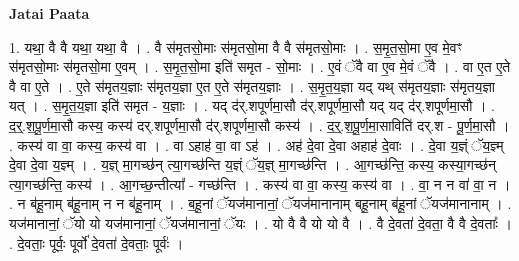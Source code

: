 \documentclass[17pt]{extarticle}
\begin{document}
\textbf{Jatai Paata} \newline

1. यथा॒ वै वै यथा॒ यथा॒ वै । . वै स॑मृतसो॒माः स॑मृतसो॒मा वै वै स॑मृतसो॒माः । . स॒मृ॒त॒सो॒मा ए॒व मे॒वꣳ स॑मृतसो॒माः स॑मृतसो॒मा ए॒वम् । . स॒मृ॒त॒सो॒मा इति॑ समृत - सो॒माः । . ए॒वं ॅवै वा ए॒व मे॒वं ॅवै । . वा ए॒त ए॒ते वै वा ए॒ते । . ए॒ते स॑मृतय॒ज्ञाः स॑मृतय॒ज्ञा ए॒त ए॒ते स॑मृतय॒ज्ञाः । . स॒मृ॒त॒य॒ज्ञा यद् यथ् स॑मृतय॒ज्ञाः स॑मृतय॒ज्ञा यत् । . स॒मृ॒त॒य॒ज्ञा इति॑ समृत - य॒ज्ञाः । . यद् द॑र्.शपूर्णमा॒सौ द॑र्.शपूर्णमा॒सौ यद् यद् द॑र्.शपूर्णमा॒सौ । . द॒र्॒.श॒पू॒र्ण॒मा॒सौ कस्य॒ कस्य॑ दर्.शपूर्णमा॒सौ द॑र्.शपूर्णमा॒सौ कस्य॑ । . द॒र्॒.श॒पू॒र्ण॒मा॒साविति॑ दर्.श - पू॒र्ण॒मा॒सौ । . कस्य॑ वा वा॒ कस्य॒ कस्य॑ वा । . वा ऽहाह॑ वा॒ वा ऽह॑ । . अह॑ दे॒वा दे॒वा अहाह॑ दे॒वाः । . दे॒वा य॒ज्ञ्ं ॅय॒ज्ञ्म् दे॒वा दे॒वा य॒ज्ञ्म् । . य॒ज्ञ् मा॒गच्छ॑न् त्या॒गच्छ॑न्ति य॒ज्ञ्ं ॅय॒ज्ञ् मा॒गच्छ॑न्ति । . आ॒गच्छ॑न्ति॒ कस्य॒ कस्या॒गच्छ॑न् त्या॒गच्छ॑न्ति॒ कस्य॑ । . आ॒गच्छ॒न्तीत्या᳚ - गच्छ॑न्ति । . कस्य॑ वा वा॒ कस्य॒ कस्य॑ वा । . वा॒ न न वा॑ वा॒ न । . न ब॑हू॒नाम् ब॑हू॒नाम् न न ब॑हू॒नाम् । . ब॒हू॒नां ॅयज॑मानानां॒ ॅयज॑मानानाम् बहू॒नाम् ब॑हू॒नां ॅयज॑मानानाम् । . यज॑मानानां॒ ॅयो यो यज॑मानानां॒ ॅयज॑मानानां॒ ॅयः । . यो वै वै यो यो वै । . वै दे॒वता॑ दे॒वता॒ वै वै दे॒वताः᳚ । . दे॒वताः॒ पूर्वः॒ पूर्वो॑ दे॒वता॑ दे॒वताः॒ पूर्वः॑ । \newline
\end{document}
